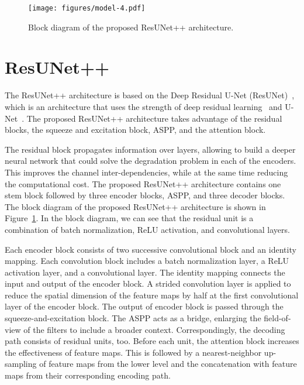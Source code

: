 \documentclass[conference]{IEEEtran}
\newcommand{\resunetplusplus}{ResUNet++\xspace}
\begin{document}
 \begin{figure}[!ht]
\centering
  \texttt{[image: figures/model-4.pdf]}
 \caption{Block diagram of the proposed \resunetplusplus architecture.}
  \label{fig:proposed_method}
  \vspace{-5mm}
 \end{figure}

 \section{\resunetplusplus}
\label{section:resunetplusplus}

The \resunetplusplus architecture is based on the Deep Residual U-Net (ResUNet)~\cite{zhang2018road}, which is an architecture that uses the strength of deep residual learning~\cite{he2016deep} and U-Net~\cite{ronneberger2015u}. The proposed \resunetplusplus architecture takes advantage of the residual blocks, the squeeze and excitation block, \ac{ASPP}, and the attention block. 

The residual block propagates information over layers, allowing to build a deeper neural network that could solve the degradation problem in each of the encoders. This improves the channel inter-dependencies, while at the same time reducing the computational cost. The proposed \resunetplusplus architecture contains one stem block followed by three encoder blocks, \ac{ASPP}, and three decoder blocks.  The block diagram of the proposed \resunetplusplus architecture is shown in Figure~\ref{fig:proposed_method}. In the block diagram, we can see that the residual unit is a combination of batch normalization, \ac{ReLU} activation, and convolutional layers. 

Each encoder block consists of two successive  convolutional block and an identity mapping. Each convolution block includes a batch normalization layer, a \ac{ReLU} activation layer, and a convolutional layer. The identity mapping connects the input and output of the encoder block. A strided convolution layer is applied to reduce the spatial dimension of the feature maps by half at the first convolutional layer of the encoder block. The output of encoder block is passed through the squeeze-and-excitation block. The \ac{ASPP} acts as a bridge, enlarging the field-of-view of the filters to include a broader context. Correspondingly, the decoding path consists of residual units, too. Before each unit, the attention block increases the effectiveness of feature maps. This is followed by a nearest-neighbor up-sampling of feature maps from the lower level and the concatenation with feature maps from their corresponding encoding path.
\end{document}
